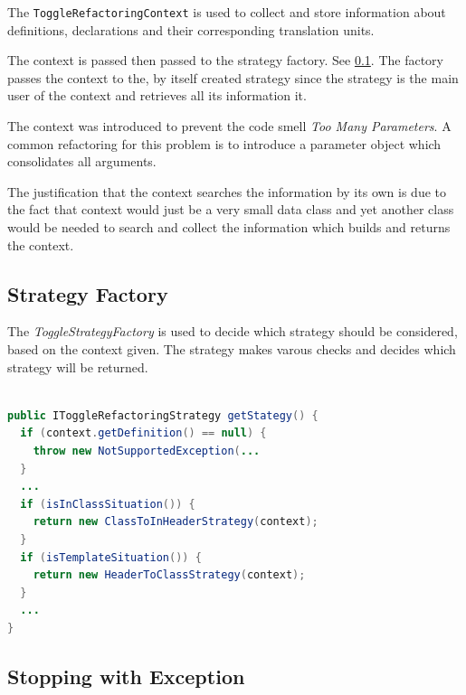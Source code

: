 The \texttt{ToggleRefactoringContext} is used to collect and store information 
about definitions, declarations and their corresponding translation units.

The context is passed then passed to the strategy factory. See \ref{factory}.
The factory passes the context to the, by itself created strategy since the
strategy is the main user of the context and retrieves all its information it.

The context was introduced to prevent the code smell \textit{Too Many 
Parameters}\cite{cwiki}. A common refactoring for this problem is to introduce a 
parameter object which consolidates all arguments.

The justification that the context searches the information by its own is due
to the fact that context would just be a very small data class and yet another
class would be needed to search and collect the information which builds and
returns the context.

\subsection{Strategy Factory}
\label{factory}

The \textit{ToggleStrategyFactory} is used to decide which strategy should be 
considered, based on the context given. The strategy makes varous checks
and decides which strategy will be returned.

\begin{lstlisting}[caption={IToggleRefactoringStrategy},
label={strategy}, language=Java]

public IToggleRefactoringStrategy getStategy() {
  if (context.getDefinition() == null) {
    throw new NotSupportedException(...
  }
  ...
  if (isInClassSituation()) {
    return new ClassToInHeaderStrategy(context);
  }
  if (isTemplateSituation()) {
    return new HeaderToClassStrategy(context);
  }
  ...
}
\end{lstlisting}

\subsection{Stopping with Exception}



